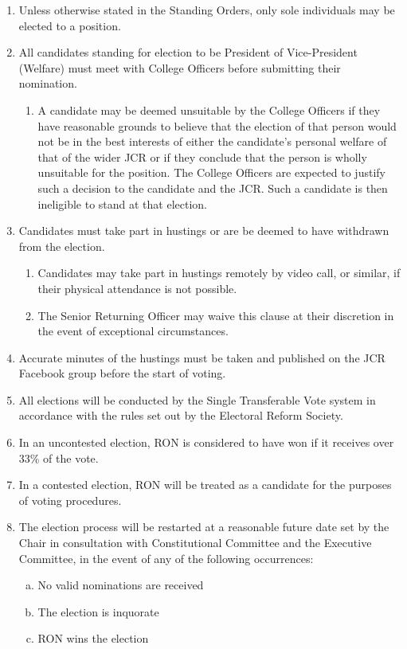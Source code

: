 \documentclass[12pt]{article}  %
\begin{document}
\begin{enumerate}
	\item Unless otherwise stated in the Standing Orders, only sole individuals may be elected to a position.
	\item All candidates standing for election to be President of Vice-President (Welfare) must meet with College Officers before submitting their nomination.
	\begin{enumerate}
		\item A candidate may be deemed unsuitable by the College Officers if they have reasonable grounds to believe that the election of that person would not be in the best interests of either the candidate’s personal welfare of that of the wider JCR or if they conclude that the person is wholly unsuitable for the position. The College Officers are expected to justify such a decision to the candidate and the JCR. Such a candidate is then ineligible to stand at that election. 
	\end{enumerate}
	\item Candidates must take part in hustings or are be deemed to have withdrawn from the election.
	\begin{enumerate}
		\item Candidates may take part in hustings remotely by video call, or similar, if their physical attendance is not possible.
		\item The Senior Returning Officer may waive this clause at their discretion in the event of exceptional circumstances.
	\end{enumerate}
	\item Accurate minutes of the hustings must be taken and published on the JCR Facebook group before the start of voting.
	\item All elections will be conducted by the Single Transferable Vote system in accordance with the rules set out by the Electoral Reform Society.
	\item In an uncontested election, RON is considered to have won if it receives over 33\% of the vote.
	\item In a contested election, RON will be treated as a candidate for the purposes of voting procedures.
	\item The election process will be restarted at a reasonable future date set by the Chair in consultation with Constitutional Committee and the Executive Committee, in the event of any of the following occurrences:
	\begin{enumerate}[(a)]
		\item No valid nominations are received
		\item The election is inquorate
		\item RON wins the election
	\end{enumerate}

\end{enumerate}
\end{document}
